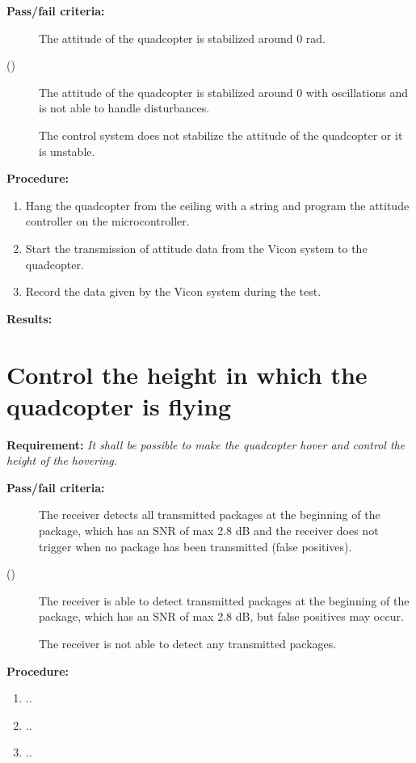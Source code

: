 \textbf{Pass/fail criteria:}
	\begin{description}
	\item[] The attitude of the quadcopter is stabilized around 0 rad.
	\item[()] The attitude of the quadcopter is stabilized around 0 with oscillations and is not able to handle disturbances.
	\item[ \phantom{)}] The control system does not stabilize the attitude of the quadcopter or it is unstable.
	\end{description}
\textbf{Procedure:}\\
\begin{enumerate}
	\item Hang the quadcopter from the ceiling with a string and program the attitude controller on the microcontroller.
	\item Start the transmission of attitude data from the Vicon system to the quadcopter.
	\item Record the data given by the Vicon system during the test.
\end{enumerate} 
\textbf{Results:}


\newpage

\section{Control the height in which the quadcopter is flying}
\textbf{Requirement:}
\textit{It shall be possible to make the quadcopter hover and control the height of the hovering.}

\textbf{Pass/fail criteria:}
	\begin{description}
	\item[  ] The receiver detects all transmitted packages at the beginning of the package, which has an SNR of max 2.8 dB and the receiver does not trigger when no package has been transmitted (false positives).
	\item[()]The receiver is able to detect transmitted packages at the beginning of the package, which has an SNR of max 2.8 dB, but false positives may occur.
	\item[  \phantom{)}]The receiver is not able to detect any transmitted packages.
	\end{description}

		
\textbf{Procedure:}\\


\begin{enumerate}
	\item ..
	\item ..
	\item ..
\end{enumerate} 



